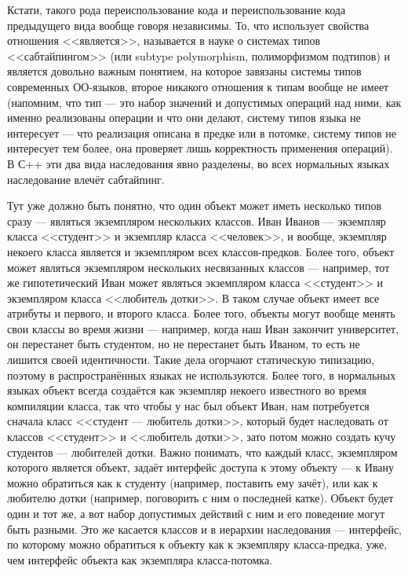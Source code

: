 \documentclass[a5paper]{article}
\begin{document}
Кстати, такого рода переиспользование кода и переиспользование кода предыдущего вида вообще говоря независимы. То, что использует свойства отношения <<является>>, называется в науке о системах типов <<сабтайпингом>> (или subtype polymorphism, полиморфизмом подтипов) и является довольно важным понятием, на которое завязаны системы типов современных ОО-языков, второе никакого отношения к типам вообще не имеет (напомним, что тип --- это набор значений и допустимых операций над ними, как именно реализованы операции и что они делают, систему типов языка не интересует --- что реализация описана в предке или в потомке, систему типов не интересует тем более, она проверяет лишь корректность применения операций). В С++ эти два вида наследования явно разделены, во всех нормальных языках наследование влечёт сабтайпинг.

Тут уже должно быть понятно, что один объект может иметь несколько типов сразу --- являться экземпляром нескольких классов. Иван Иванов --- экземпляр класса <<студент>> и экземпляр класса <<человек>>, и вообще, экземпляр некоего класса является и экземпляром всех классов-предков. Более того, объект может являться экземпляром нескольких несвязанных классов --- например, тот же гипотетический Иван может являться экземпляром класса <<студент>> и экземпляром класса <<любитель дотки>>. В таком случае объект имеет все атрибуты и первого, и второго класса. Более того, объекты могут вообще менять свои классы во время жизни --- например, когда наш Иван закончит университет, он перестанет быть студентом, но не перестанет быть Иваном, то есть не лишится своей идентичности. Такие дела огорчают статическую типизацию, поэтому в распространённых языках не используются. Более того, в нормальных языках объект всегда создаётся как экземпляр некоего известного во время компиляции класса, так что чтобы у нас был объект Иван, нам потребуется сначала класс <<студент --- любитель дотки>>, который будет наследовать от классов <<студент>> и <<любитель дотки>>, зато потом можно создать кучу студентов --- любителей дотки. Важно понимать, что каждый класс, экземпляром которого является объект, задаёт интерфейс доступа к этому объекту --- к Ивану можно обратиться как к студенту (например, поставить ему зачёт), или как к любителю дотки (например, поговорить с ним о последней катке). Объект будет один и тот же, а вот набор допустимых действий с ним и его поведение могут быть разными. Это же касается классов и в иерархии наследования --- интерфейс, по которому можно обратиться к объекту как к экземпляру класса-предка, уже, чем интерфейс объекта как экземпляра класса-потомка.
\end{document}
